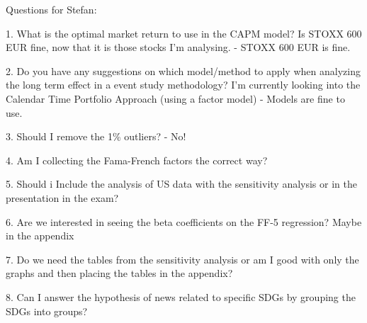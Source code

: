 Questions for Stefan:

1. What is the optimal market return to use in the CAPM model? Is STOXX 600 EUR fine, now that it is those stocks I'm analysing. 
- STOXX 600 EUR is fine. 

2. Do you have any suggestions on which model/method to apply when analyzing the long term effect in a event study methodology? I'm currently looking into the Calendar Time Portfolio Approach (using a factor model) - Models are fine to use. 

3. Should I remove the 1\% outliers?
- No!



4. Am I collecting the Fama-French factors the correct way? 

5.  Should i Include the analysis of US data with the sensitivity analysis or in the presentation in the exam?

6. Are we interested in seeing the beta coefficients on the FF-5 regression? Maybe in the appendix

7. Do we need the tables from the sensitivity analysis or am I good with only the graphs and then placing the tables in the appendix?

8. Can I answer the hypothesis of news related to specific SDGs by grouping the SDGs into groups?